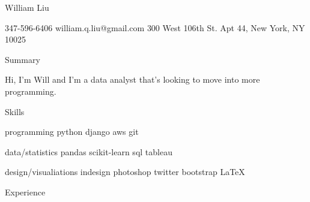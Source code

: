 \documentclass[11pt,letterpaper]{article}
\begin{document}
\textsf{\textcolor{customlightblue}{\Large{William Liu}}}

\smallskip

\small{347-596-6406} \hfill
\small{william.q.liu@gmail.com} \hfill
\small{300 West 106th St. Apt 44, New York, NY 10025}

\bigskip
\medskip


\textsf{\textcolor{customlightblue}{\Large{Summary}}}  %

\smallskip

\normalsize{Hi, I'm Will and I'm a data analyst that's looking to move into more programming. } %

\bigskip
\medskip

\textsf{\textcolor{customlightblue}{\Large{Skills}}}  %

\smallskip




\begin{description*}
    \item[programming] \hfill
    python \hfill
    django \hfill
    aws \hfill
    git
    \item[data/statistics] \hfill
    pandas \hfill
    scikit-learn \hfill
    sql \hfill
    tableau
    \item[design/visualiations] \hfill
    indesign \hfill
    photoshop \hfill
    twitter bootstrap \hfill
    LaTeX
\end{description*}



\bigskip
\medskip


\textsf{\textcolor{customlightblue}{\Large{Experience}}}  %

\smallskip
\end{document}
